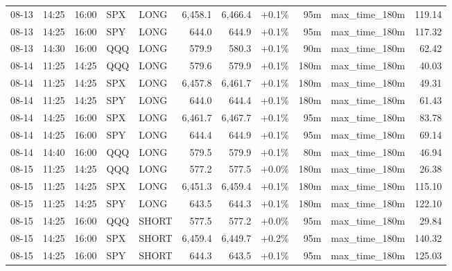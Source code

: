 \documentclass[11pt,a4paper,twoside]{article}
\begin{document}
\begin{center}
\begin{longtable}{>{\color{txtmain}}l l l l l r r r r >{\color{txtmain}}l r}
08-13 & 14:25 & 16:00 & SPX & LONG & 6,458.1 & 6,466.4 & \textcolor{wingreen}{+0.1\%} & 95m & max\_time\_180m & \textcolor{wingreen}{119.14} \\
08-13 & 14:25 & 16:00 & SPY & LONG & 644.0 & 644.9 & \textcolor{wingreen}{+0.1\%} & 95m & max\_time\_180m & \textcolor{wingreen}{117.32} \\
08-13 & 14:30 & 16:00 & QQQ & LONG & 579.9 & 580.3 & \textcolor{wingreen}{+0.1\%} & 90m & max\_time\_180m & \textcolor{wingreen}{62.42} \\
08-14 & 11:25 & 14:25 & QQQ & LONG & 579.6 & 579.9 & \textcolor{wingreen}{+0.1\%} & 180m & max\_time\_180m & \textcolor{wingreen}{40.03} \\
08-14 & 11:25 & 14:25 & SPX & LONG & 6,457.8 & 6,461.7 & \textcolor{wingreen}{+0.1\%} & 180m & max\_time\_180m & \textcolor{wingreen}{49.31} \\
08-14 & 11:25 & 14:25 & SPY & LONG & 644.0 & 644.4 & \textcolor{wingreen}{+0.1\%} & 180m & max\_time\_180m & \textcolor{wingreen}{61.43} \\
08-14 & 14:25 & 16:00 & SPX & LONG & 6,461.7 & 6,467.7 & \textcolor{wingreen}{+0.1\%} & 95m & max\_time\_180m & \textcolor{wingreen}{83.78} \\
08-14 & 14:25 & 16:00 & SPY & LONG & 644.4 & 644.9 & \textcolor{wingreen}{+0.1\%} & 95m & max\_time\_180m & \textcolor{wingreen}{69.14} \\
08-14 & 14:40 & 16:00 & QQQ & LONG & 579.5 & 579.9 & \textcolor{wingreen}{+0.1\%} & 80m & max\_time\_180m & \textcolor{wingreen}{46.94} \\
08-15 & 11:25 & 14:25 & QQQ & LONG & 577.2 & 577.5 & \textcolor{wingreen}{+0.0\%} & 180m & max\_time\_180m & \textcolor{wingreen}{26.38} \\
08-15 & 11:25 & 14:25 & SPX & LONG & 6,451.3 & 6,459.4 & \textcolor{wingreen}{+0.1\%} & 180m & max\_time\_180m & \textcolor{wingreen}{115.10} \\
08-15 & 11:25 & 14:25 & SPY & LONG & 643.5 & 644.3 & \textcolor{wingreen}{+0.1\%} & 180m & max\_time\_180m & \textcolor{wingreen}{122.10} \\
08-15 & 14:25 & 16:00 & QQQ & SHORT & 577.5 & 577.2 & \textcolor{wingreen}{+0.0\%} & 95m & max\_time\_180m & \textcolor{wingreen}{29.84} \\
08-15 & 14:25 & 16:00 & SPX & SHORT & 6,459.4 & 6,449.7 & \textcolor{wingreen}{+0.2\%} & 95m & max\_time\_180m & \textcolor{wingreen}{140.32} \\
08-15 & 14:25 & 16:00 & SPY & SHORT & 644.3 & 643.5 & \textcolor{wingreen}{+0.1\%} & 95m & max\_time\_180m & \textcolor{wingreen}{125.03} \\

\end{longtable}
\end{center}
\end{document}
